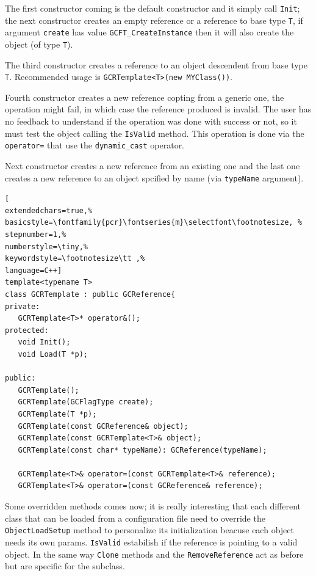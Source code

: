 The first constructor coming is the default constructor and it simply call \texttt{Init}; the next constructor creates an empty reference or a reference to base type \texttt{T}, if argument \texttt{create} has value \texttt{GCFT\_CreateInstance} then it will also create the object (of type \texttt{T}).

The third constructor creates a reference to an object descendent from base type \texttt{T}. Recommended usage is \texttt{GCRTemplate<T>(new MYClass())}.

Fourth constructor creates a new reference copting from a generic one, the operation might fail, in which case the reference produced is invalid. The user has no feedback to understand if the operation was done with success or not, so it must test the object calling the \texttt{IsValid} method. This operation is done via the \texttt{operator=} that use the \texttt{dynamic\_cast} operator.

Next constructor creates a new reference from an existing one and the last one creates a new reference to an object spcified by name (via \texttt{typeName} argument).
\begin{lstlisting}[
extendedchars=true,%
basicstyle=\fontfamily{pcr}\fontseries{m}\selectfont\footnotesize, %
stepnumber=1,%
numberstyle=\tiny,%
keywordstyle=\footnotesize\tt ,%
language=C++]
template<typename T>
class GCRTemplate : public GCReference{
private:
   GCRTemplate<T>* operator&();
protected:
   void Init();
   void Load(T *p);

public:
   GCRTemplate();
   GCRTemplate(GCFlagType create);
   GCRTemplate(T *p);
   GCRTemplate(const GCReference& object);
   GCRTemplate(const GCRTemplate<T>& object);
   GCRTemplate(const char* typeName): GCReference(typeName);

   GCRTemplate<T>& operator=(const GCRTemplate<T>& reference);
   GCRTemplate<T>& operator=(const GCReference& reference);
\end{lstlisting}

Some overridden methods comes now; it is really interesting that each different class that can be loaded from a configuration file need to override the \texttt{ObjectLoadSetup} method to personalize its initialization beacuse each object needs its own params. \texttt{IsValid} estabilish if the reference is pointing to a valid object. In the same way \texttt{Clone} methods and the \texttt{RemoveReference} act as before but are specific for the subclass.

